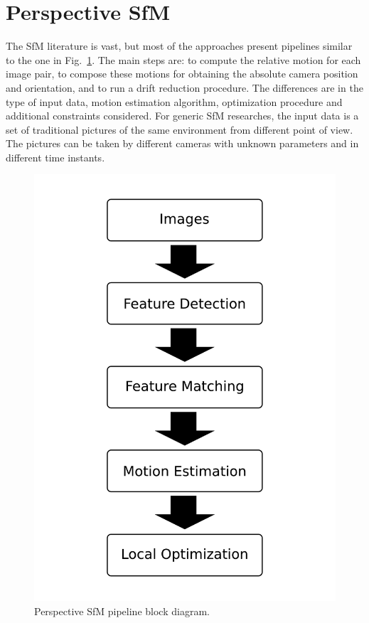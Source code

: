\section{Perspective SfM}
The SfM literature is vast, but most of the approaches present pipelines similar to the one in 
Fig.~\ref{fig:block_diagram}.
The main steps are: to compute the relative motion for each image
pair, to compose these motions for obtaining the absolute camera position and 
orientation, and to run a drift reduction procedure.
%
The differences are in the type of input data, motion estimation algorithm,
optimization procedure and additional constraints considered.
For generic SfM researches, the input data is a set of traditional pictures of 
the same environment from different point of view. The pictures can be taken by 
different cameras with unknown parameters and in different time instants.
%
\begin{figure}
	\centering
	\includegraphics[width=\linewidth]{img/block_diagram.pdf}
	\caption{Perspective SfM pipeline block diagram.}
	\label{fig:block_diagram}
\end{figure}

